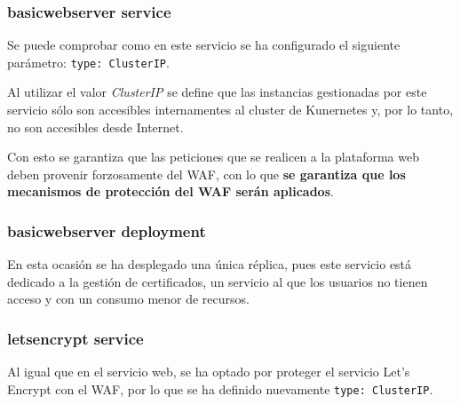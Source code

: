 \subsubsection{ basicwebserver service}
\begin{minipage}{0.8\linewidth}
  
\end{minipage}
\par Se puede comprobar como en este servicio se ha configurado el siguiente parámetro: \lstinline{type: ClusterIP}.
\par Al utilizar el valor {\em ClusterIP} se define que las instancias gestionadas por este servicio sólo
son accesibles internamentes al cluster de Kunernetes y, por lo tanto, no son accesibles desde Internet.
\par Con esto se garantiza que las peticiones que se realicen a la plataforma web deben provenir
forzosamente del WAF, con lo que {\bf se garantiza que los mecanismos de protección del WAF serán
aplicados}.

\subsubsection{ basicwebserver deployment}
\begin{minipage}{0.8\linewidth}
  
\end{minipage}
\par En esta ocasión se ha desplegado una única réplica, pues este servicio está dedicado a la gestión de
certificados, un servicio al que los usuarios no tienen acceso y con un consumo menor de recursos.

\subsubsection{ letsencrypt service}
\begin{minipage}{0.8\linewidth}
  
\end{minipage}
\par Al igual que en el servicio web, se ha optado por proteger el servicio Let's Encrypt con el WAF, por
lo que se ha definido nuevamente \lstinline{type: ClusterIP}.


